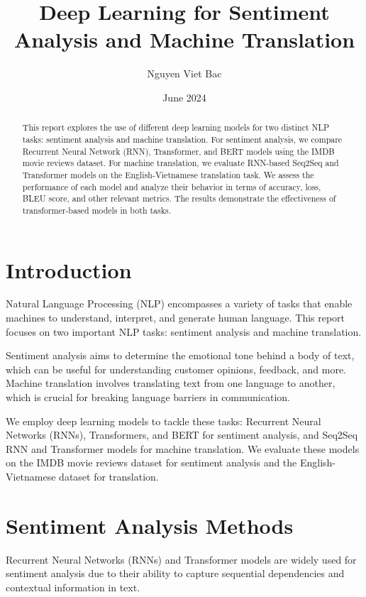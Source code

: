 \documentclass{article}
\title{Deep Learning for Sentiment Analysis and Machine Translation}
\author{Nguyen Viet Bac}
\date{June 2024}
\begin{document}
\maketitle

\begin{abstract}
This report explores the use of different deep learning models for two distinct NLP tasks: sentiment analysis and machine translation. For sentiment analysis, we compare Recurrent Neural Network (RNN), Transformer, and BERT models using the IMDB movie reviews dataset. For machine translation, we evaluate RNN-based Seq2Seq and Transformer models on the English-Vietnamese translation task. We assess the performance of each model and analyze their behavior in terms of accuracy, loss, BLEU score, and other relevant metrics. The results demonstrate the effectiveness of transformer-based models in both tasks.
\end{abstract}

\section{Introduction}
Natural Language Processing (NLP) encompasses a variety of tasks that enable machines to understand, interpret, and generate human language. This report focuses on two important NLP tasks: sentiment analysis and machine translation.

Sentiment analysis aims to determine the emotional tone behind a body of text, which can be useful for understanding customer opinions, feedback, and more. Machine translation involves translating text from one language to another, which is crucial for breaking language barriers in communication.

We employ deep learning models to tackle these tasks: Recurrent Neural Networks (RNNs), Transformers, and BERT for sentiment analysis, and Seq2Seq RNN and Transformer models for machine translation. We evaluate these models on the IMDB movie reviews dataset for sentiment analysis and the English-Vietnamese dataset for translation.

\section{Sentiment Analysis Methods}

Recurrent Neural Networks (RNNs) and Transformer models are widely used for sentiment analysis due to their ability to capture sequential dependencies and contextual information in text.
\end{document}
